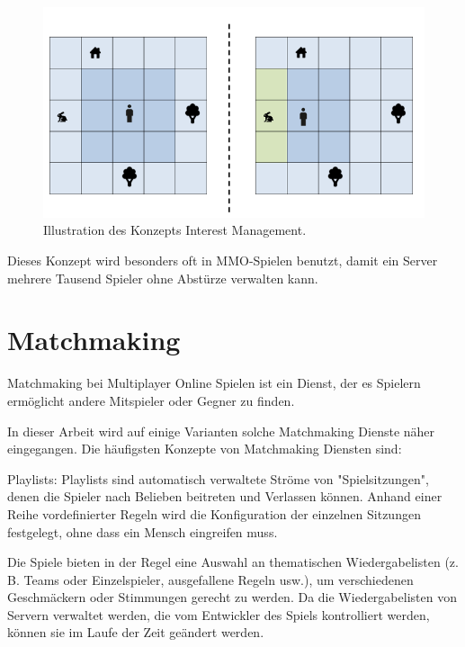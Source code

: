 \begin{figure}
	\centering
	\includegraphics[width=150mm]{images/interest_management.png}
	\caption[Interest Management]{Illustration des Konzepts Interest Management. \cite{JeromeRenaux.2017} }
	\label{pic:interest_management}
\end{figure}

Dieses Konzept wird besonders oft in MMO-Spielen benutzt, damit ein Server mehrere Tausend Spieler ohne Abstürze verwalten kann. 

\cite{Smed.2002c}


\section{Matchmaking}

Matchmaking bei Multiplayer Online Spielen ist ein Dienst, der es Spielern ermöglicht andere Mitspieler oder Gegner zu finden. \cite{.2014}

In dieser Arbeit wird auf einige Varianten solche Matchmaking Dienste näher eingegangen. Die häufigsten Konzepte von Matchmaking Diensten sind:

Playlists:
Playlists sind automatisch verwaltete Ströme von "Spielsitzungen", denen die Spieler nach Belieben beitreten und Verlassen können. Anhand einer Reihe vordefinierter Regeln wird die Konfiguration der einzelnen Sitzungen festgelegt, ohne dass ein Mensch eingreifen muss.  

Die Spiele bieten in der Regel eine Auswahl an thematischen Wiedergabelisten (z. B. Teams oder Einzelspieler, ausgefallene Regeln usw.), um verschiedenen Geschmäckern oder Stimmungen gerecht zu werden. Da die Wiedergabelisten von Servern verwaltet werden, die vom Entwickler des Spiels kontrolliert werden, können sie im Laufe der Zeit geändert werden.

